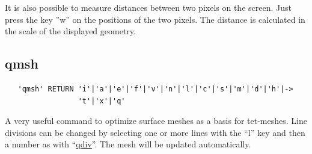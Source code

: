 \documentclass{article}
\providecommand{\htmlref}[2]{\hyperref[#2]{#1}}
\begin{document}
It is also possible to measure distances between two pixels on the screen. Just press the key ''w'' on the positions of the two pixels. The distance is calculated in the scale of the displayed geometry.  


\subsection{\label{qmsh}qmsh}
\begin{verbatim}
   'qmsh' RETURN 'i'|'a'|'e'|'f'|'v'|'n'|'l'|'c'|'s'|'m'|'d'|'h'|->
                 't'|'x'|'q'
\end{verbatim}
A very useful command to optimize surface meshes as a basis for tet-meshes. Line divisions can be changed by selecting one or more lines with the ``l'' key and then a number as with ``\htmlref{qdiv}{qdiv}''. The mesh will be updated automatically.
\end{document}
